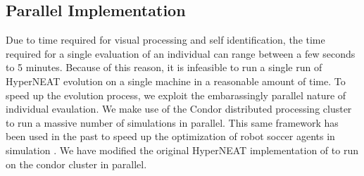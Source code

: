 \documentclass{acm_proc_article-sp}
\begin{document}
\subsection{Parallel Implementation}
\label{sec:condor}
Due to time required for visual processing and self identification, the time required for a single evaluation of an individual can range between a few seconds to 5 minutes. Because of this reason, it is infeasible to run a single run of HyperNEAT evolution on a single machine in a reasonable amount of time. To speed up the evolution process, we exploit the embarassingly parallel nature of individual evaulation. We make use of the Condor distributed processing cluster \cite{condor} to run a massive number of simulations in parallel. This same framework has been used in the past to speed up the optimization of robot soccer agents in simulation \cite{urieli}. We have modified the original HyperNEAT implementation of \cite{original-authors} to run on the condor cluster in parallel.


\end{document}
